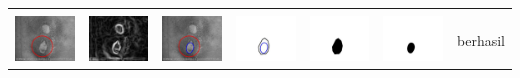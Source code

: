 \begin{table}[H]
\begin{tabular}{|m{0.7in}|m{0.7in}|m{0.7in}|m{0.7in}|m{0.7in}|m{0.7in}|m{0.7in}|}
		&  &  & & & &  \\
		\includegraphics[width=0.7in]{dataset/dataset_3/luka_kuning/ready/25_interp_init.jpg}&
		\includegraphics[width=0.7in]{dataset/dataset_3/luka_kuning/ready/25_interp_ext.jpg}&
		\includegraphics[width=0.7in]{dataset/dataset_3/luka_kuning/ready/25_interp_result.jpg}&
		\includegraphics[width=0.7in]{dataset/dataset_3/luka_kuning/ready/25_gt_r.jpg}&
		\includegraphics[width=0.7in]{dataset/dataset_3/luka_kuning/ready/25_r.jpg}&
		\includegraphics[width=0.7in]{dataset/dataset_3/luka_kuning/ready/25_interp_r.jpg}&
		berhasil\\
		\hline
	\end{tabular}
\end{table}

